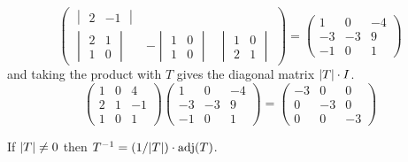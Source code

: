 \begin{example}
\begin{equation*}
\begin{pmatrix}
\begin{vmatrix}
             2  &-1
           \end{vmatrix}            \\[2.1ex]
      \begin{vmatrix}
           2  &1  \\
           1  &0
         \end{vmatrix}
      &-\begin{vmatrix}
             1  &0  \\
             1  &0
           \end{vmatrix}
      &\begin{vmatrix}
             1  &0  \\
             2  &1
           \end{vmatrix}
    \end{pmatrix}
    \!\!=\!                 
    \begin{pmatrix}
       1  &0  &-4  \\
       -3 &-3 &9  \\
       -1 &0  &1
    \end{pmatrix}         
\end{equation*}
and taking the product with $T$ gives the diagonal matrix $\deter{T}\cdot I$.
\begin{equation*}
  \begin{pmatrix}
    1  &0  &4  \\
    2  &1  &-1 \\
    1  &0  &1
  \end{pmatrix}
  \begin{pmatrix}
    1  &0  &-4  \\
    -3 &-3 &9  \\
    -1 &0  &1
   \end{pmatrix}         
  =\begin{pmatrix}
     -3  &0  &0  \\
      0  &-3 &0  \\
      0  &0  &-3
   \end{pmatrix}
\end{equation*}
\end{example}

\begin{corollary} \label{cor:InvFromAdj}
If \( \deter{T}\neq 0 \) then
$T^{-1}=(1/\deter{T})\cdot\adj(T)$.
\end{corollary}

